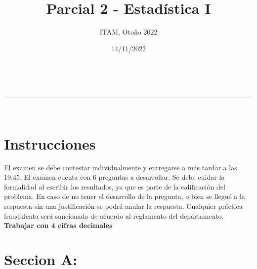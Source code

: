 \documentclass[addpoints]{exam}
\makeatletter
\newcommand{\linia}{\rule{\linewidth}{0.5pt}}
\theoremstyle{mytheor}
\renewcommand{\maketitle}{
    \begin{center}
    \vspace{2ex}
    {\huge \textsc{\@title}}
    \vspace{1ex}
    \\
    \linia\\
    \@author \hfill \@date
    \vspace{4ex}
    \end{center}
  }
\makeatother
\begin{document}
  
  \title{Parcial 2 - Estadística I}
  
  \author{ITAM, Otoño 2022}
  
  \date{14/11/2022}
  
  \maketitle
  
  \section*{Instrucciones}
  El examen se debe contestar individualmente y entregarse a más tardar a las 19:45. El examen cuenta con 6 preguntas a desarrollar. Se debe cuidar la formalidad al escribir los resultados, ya que es parte de la calificación del problema. En caso de no tener el desarrollo de la pregunta, o bien se llegué a la respuesta sin una justificación se podrá anular la respuesta. Cualquier práctica fraudulenta será sancionada de acuerdo al reglamento del departamento. \textbf{Trabajar con 4 cifras decimales}
  
\vspace{10pt}

  \section*{Seccion A: }
  
\end{document}
